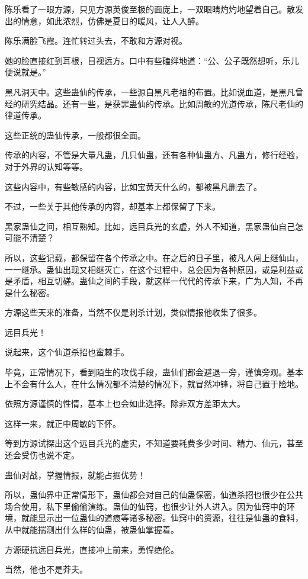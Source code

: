 \begin{this_body}
陈乐看了一眼方源，只见方源英俊至极的面庞上，一双眼睛灼灼地望着自己。散发出的情意，如此浓烈，仿佛是夏日的暖风，让人入醉。

陈乐满脸飞霞。连忙转过头去，不敢和方源对视。

她的脸直接红到耳根，目视远方。口中有些磕绊地道：“公、公子既然想听，乐儿便说就是。”

黑凡洞天中。这些蛊仙的传承，一些源自黑凡老祖的布置。比如说血道，是黑凡曾经的研究结晶。还有一些，是获罪蛊仙的传承。比如周敏的光道传承，陈尺老仙的律道传承。

这些正统的蛊仙传承，一般都很全面。

传承的内容，不管是大量凡蛊，几只仙蛊，还有各种仙蛊方、凡蛊方，修行经验，对于外界的认知等等。

这些内容中，有些敏感的内容，比如宝黄天什么的，都被黑凡删去了。

不过，一些关于其他传承的内容，却基本上都保留了下来。

黑家蛊仙之间，相互熟知。比如，远目兵光的玄虚，外人不知道，黑家蛊仙自己怎可能不清楚？

所以，这些记载，都保留在各个传承之中。在之后的日子里，被凡人闯上继仙山，一一继承。蛊仙出现又相继灭亡，在这个过程中，总会因为各种原因，或是利益或是矛盾，相互切磋。蛊仙之间的手段，就这样一代代的传承下来，广为人知，不再是什么秘密。

方源这些天来的准备，当然不仅是刺杀计划，类似情报他收集了很多。

远目兵光！

说起来，这个仙道杀招也蛮棘手。

毕竟，正常情况下，看到陌生的攻伐手段，蛊仙们都会避退一旁，谨慎旁观。基本上不会有什么人，在什么情况都不清楚的情况下，就冒然冲锋，将自己置于险地。

依照方源谨慎的性情，基本上也会如此选择。除非双方差距太大。

这样一来，就正中周敏的下怀。

等到方源试探出这个远目兵光的虚实，不知道要耗费多少时间、精力、仙元，甚至还会受伤也说不定。

蛊仙对战，掌握情报，就能占据优势！

所以，蛊仙界中正常情形下，蛊仙都会对自己的仙蛊保密，仙道杀招也很少在公共场合使用，私下里偷偷演练。蛊仙的仙窍，也很少让外人进入。因为仙窍中的环境，就能显示出一位蛊仙的道痕等诸多秘密。仙窍中的资源，往往是仙蛊的食料，从中就能揣测出什么样的仙蛊，被蛊仙掌握着。

方源硬抗远目兵光，直接冲上前来，勇悍绝伦。

当然，他也不是莽夫。


\end{this_body}
